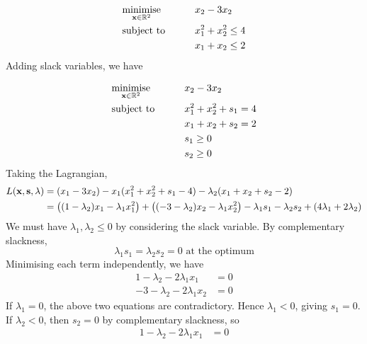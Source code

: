 \begin{example}
	\begin{alignat*}{2}
		 & \underset{\vb x \in \mathbb R^2}{\text{minimise}} & \qquad & x_2 - 3x_2           \\
		 & \text{subject to}                                 &        & x_1^2 + x_2^2 \leq 4 \\
		 &                                                   &        & x_1 + x_2 \leq 2
	\end{alignat*}
	Adding slack variables, we have

	\begin{alignat*}{2}
		 & \underset{\vb x \in \mathbb R^2}{\text{minimise}} & \qquad & x_2 - 3x_2              \\
		 & \text{subject to}                                 &        & x_1^2 + x_2^2 + s_1 = 4 \\
		 &                                                   &        & x_1 + x_2 + s_2 = 2     \\
		 &                                                   &        & s_1 \geq 0              \\
		 &                                                   &        & s_2 \geq 0
	\end{alignat*}
	Taking the Lagrangian,
	\begin{align*}
		L(\vb x, \vb s, \vb \lambda) & = (x_1 - 3x_2) - x_1(x_1^2 + x_2^2 + s_1 - 4) - \lambda_2(x_1 + x_2 + s_2 - 2)                                                                       \\
		                                      & = \qty((1 - \lambda_2)x_1 - \lambda_1 x_1^2) + \qty((-3-\lambda_2)x_2 - \lambda_1 x_2^2) - \lambda_1 s_1 - \lambda_2 s_2 + (4\lambda_1 + 2\lambda_2)
	\end{align*}
	We must have \(\lambda_1, \lambda_2 \leq 0\) by considering the slack variable.
	By complementary slackness,
	\[
		\lambda_1 s_1 = \lambda_2 s_2 = 0 \text{ at the optimum}
	\]
	Minimising each term independently, we have
	\begin{align*}
		1 - \lambda_2 - 2\lambda_1 x_1 & = 0 \\
		-3-\lambda_2 - 2\lambda_1 x_2  & = 0
	\end{align*}
	If \(\lambda_1 = 0\), the above two equations are contradictory.
	Hence \(\lambda_1 < 0\), giving \(s_1 = 0\).
	If \(\lambda_2 < 0\), then \(s_2 = 0\) by complementary slackness, so
	\begin{align*}
		1 - \lambda_2 - 2\lambda_1 x_1 & = 0 \\

\end{align*}
\end{example}
